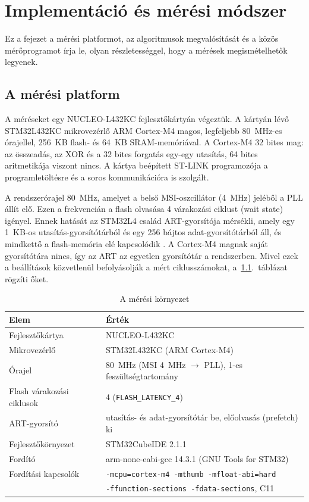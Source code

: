 \documentclass[a4paper,12pt]{report}
\theoremstyle{definition}
\theoremstyle{remark}
\begin{document}
\chapter{Implementáció és mérési módszer}\label{chap:implementacio}

Ez a fejezet a mérési platformot, az algoritmusok megvalósítását és a közös mérőprogramot írja le, olyan részletességgel, hogy a mérések megismételhetők legyenek.

\section{A mérési platform}\label{sec:platform}

A méréseket egy NUCLEO-L432KC fejlesztőkártyán végeztük. A kártyán lévő STM32L432KC mikrovezérlő ARM Cortex-M4 magos, legfeljebb 80~MHz-es órajellel, 256~KB flash- és 64~KB SRAM-memóriával. A Cortex-M4 32 bites mag: az összeadás, az XOR és a 32 bites forgatás egy-egy utasítás, 64 bites aritmetikája viszont nincs. A kártya beépített ST-LINK programozója a programletöltésre és a soros kommunikációra is szolgált.

A rendszerórajel 80~MHz, amelyet a belső MSI-oszcillátor (4~MHz) jeléből a PLL állít elő. Ezen a frekvencián a flash olvasása 4 várakozási ciklust (wait state) igényel. Ennek hatását az STM32L4 család ART-gyorsítója mérsékli, amely egy 1~KB-os utasítás-gyorsítótárból és egy 256 bájtos adat-gyorsítótárból áll, és mindkettő a flash-memória elé kapcsolódik \cite{RM0394}. A Cortex-M4 magnak saját gyorsítótára nincs, így az ART az egyetlen gyorsítótár a rendszerben. Mivel ezek a beállítások közvetlenül befolyásolják a mért ciklusszámokat, a~\ref{tab:platform}.~táblázat rögzíti őket.

\begin{table}[htbp]
	\centering
	\small
	\caption{A mérési környezet}
	\label{tab:platform}
	\begin{tabular}{|l|l|}
		\hline
		\textbf{Elem} & \textbf{Érték} \\ \hline
		Fejlesztőkártya & NUCLEO-L432KC \\ \hline
		Mikrovezérlő & STM32L432KC (ARM Cortex-M4) \\ \hline
		Órajel & 80~MHz (MSI 4~MHz $\rightarrow$ PLL), 1-es feszültségtartomány \\ \hline
		Flash várakozási ciklusok & 4 (\texttt{FLASH\_LATENCY\_4}) \\ \hline
		ART-gyorsító & utasítás- és adat-gyorsítótár be, előolvasás (prefetch) ki \\ \hline
		Fejlesztőkörnyezet & STM32CubeIDE 2.1.1 \\ \hline
		Fordító & arm-none-eabi-gcc 14.3.1 (GNU Tools for STM32) \\ \hline
		Fordítási kapcsolók & \texttt{-mcpu=cortex-m4 -mthumb -mfloat-abi=hard} \\
		& \texttt{-ffunction-sections -fdata-sections}, C11 \\ \hline
	\end{tabular}
\end{table}
\end{document}
